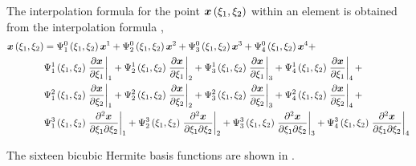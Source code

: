The interpolation formula for the point
$\fnof{\vect{x}}{\xione,\xitwo}$ within an element is obtained from the
\bicubicherm interpolation formula \cite{nielsen:1991a}, 
\begin{equation}
  \begin{split}
    \fnof{\vect{x}}{\xione,\xitwo} &=
    \chbfn{1}{0}{\xione,\xitwo}\nodept{\vect{x}}{1} +
    \chbfn{2}{0}{\xione,\xitwo}\nodept{\vect{x}}{2} +
    \chbfn{3}{0}{\xione,\xitwo}\nodept{\vect{x}}{3} +
    \chbfn{4}{0}{\xione,\xitwo}\nodept{\vect{x}}{4} + \\
    & \chbfn{1}{1}{\xione,\xitwo}\evalat{\delby{\vect{x}}{\xione}}{1}+
    \chbfn{2}{1}{\xione,\xitwo}\evalat{\delby{\vect{x}}{\xione}}{2}+ 
    \chbfn{3}{1}{\xione,\xitwo}\evalat{\delby{\vect{x}}{\xione}}{3}+
    \chbfn{4}{1}{\xione,\xitwo}\evalat{\delby{\vect{x}}{\xione}}{4} + \\ 
    & \chbfn{1}{2}{\xione,\xitwo}\evalat{\delby{\vect{x}}{\xitwo}}{1}+
    \chbfn{2}{2}{\xione,\xitwo}\evalat{\delby{\vect{x}}{\xitwo}}{2} + 
    \chbfn{3}{2}{\xione,\xitwo}\evalat{\delby{\vect{x}}{\xitwo}}{3}+
    \chbfn{4}{2}{\xione,\xitwo}\evalat{\delby{\vect{x}}{\xitwo}}{4} + \\ 
    & \chbfn{1}{3}{\xione,\xitwo}\evalat{\deltwoby{\vect{x}}{\xione}{\xitwo}}{1} +
    \chbfn{2}{3}{\xione,\xitwo}\evalat{\deltwoby{\vect{x}}{\xione}{\xitwo}}{2} +
    \chbfn{3}{3}{\xione,\xitwo}\evalat{\deltwoby{\vect{x}}{\xione}{\xitwo}}{3} + 
    \chbfn{4}{3}{\xione,\xitwo}\evalat{ \deltwoby{\vect{x}}{\xione}{\xitwo}}{4}    
  \end{split}
  \label{eqn:bichxiinterp}
\end{equation}

The sixteen \twodal bicubic Hermite basis functions are shown in .
            
